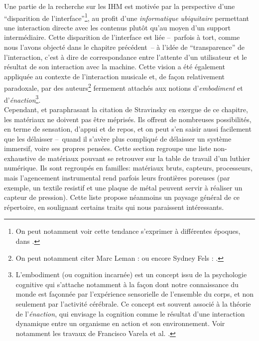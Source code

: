 \noindent Une partie de la recherche sur les \gls{IHM} est motivée par la perspective d'une ``disparition de l'interface''\footnote{On peut notamment voir cette tendance s'exprimer à différentes époques, dans \cite{weiser_computer_1991, dey_distributed_2001, hui_towards_2017}.}, au profit d'une \textit{informatique ubiquitaire} permettant une interaction directe avec les contenus plutôt qu'au moyen d'un support intermédiaire. Cette disparition de l'interface est liée --~parfois à tort, comme nous l'avons objecté dans le chapitre précédent~-- à l'idée de ``transparence'' de l'interaction, c'est à dire de correspondance entre l'attente d'un utilisateur et le résultat de son interaction avec la machine. Cette vision a été également appliquée au contexte de l'interaction musicale et, de façon relativement paradoxale, par des auteurs\footnote{On peut notamment citer Marc Leman : \cite{leman_embodied_2008} ou encore Sydney Fels :  \cite{fels_mapping_2002}.} fermement attachés aux notions d'\textit{embodiment} et d'\textit{énaction}\footnote{L'embodiment (ou cognition incarnée) est un concept issu de la psychologie cognitive qui s'attache notamment à la façon dont notre connaissance du monde est façonnée par l'expérience sensorielle de l'ensemble du corps, et non seulement par l'activité cérébrale. Ce concept est souvent associé à la théorie de l'\textit{énaction}, qui envisage la cognition comme le résultat d'une interaction dynamique entre un organisme en action et son environnement. Voir notamment les travaux de Francisco Varela et al. \cite{varela_inscription_1993}.}.\\
\indent Cependant, et paraphrasant la citation de Stravinsky en exergue de ce chapitre, les matériaux ne doivent pas être méprisés. Ils offrent de nombreuses possibilités, en terme de sensation, d'appui et de repos, et on peut s'en saisir aussi facilement que les délaisser --~quand il s'avère plus compliqué de délaisser un système immersif, voire ses propres pensées. Cette section regroupe une liste non-exhaustive de matériaux pouvant se retrouver sur la table de travail d'un luthier numérique. Ils sont regroupés en familles: matériaux bruts, capteurs, processeurs, mais l'agencement instrumental rend parfois leurs frontières poreuses (par exemple, un textile resistif et une plaque de métal peuvent servir à réaliser un capteur de pression). Cette liste propose néanmoins un paysage général de ce répertoire, en soulignant certains traits qui nous paraissent intéressants.

